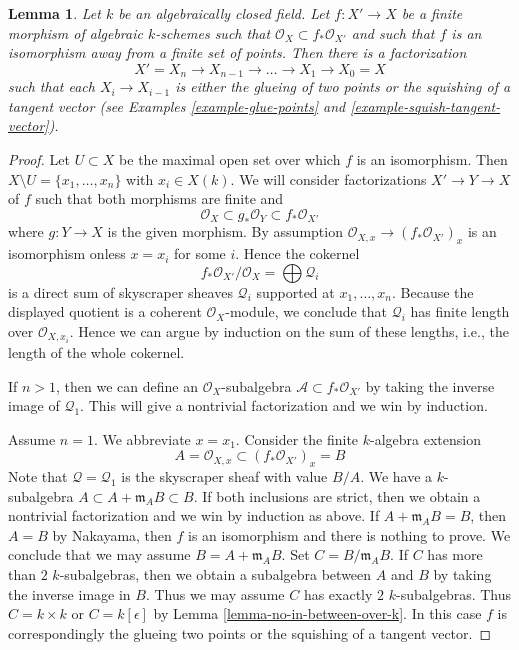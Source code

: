 \documentclass{stacks-project}
\theoremstyle{plain}
\newtheorem{lemma}[subsection]{Lemma}
\theoremstyle{definition}
\theoremstyle{remark}
\numberwithin{equation}{subsection}
\begin{document}
\begin{lemma}
\label{lemma-factor-almost-isomorphism}
Let $k$ be an algebraically closed field. Let $f : X' \to X$ be a
finite morphism of algebraic $k$-schemes such that
$\mathcal{O}_X \subset f_*\mathcal{O}_{X'}$ and such that $f$ is an
isomorphism away from a finite set of points. Then there is a factorization
$$
X' = X_n \to X_{n - 1} \to \ldots \to X_1 \to X_0 = X
$$
such that each $X_i \to X_{i - 1}$ is either the glueing of
two points or the squishing of a tangent vector
(see Examples \ref{example-glue-points} and
\ref{example-squish-tangent-vector}).
\end{lemma}

\begin{proof}
Let $U \subset X$ be the maximal open set over which $f$ is an isomorphism.
Then $X \setminus U = \{x_1, \ldots, x_n\}$ with $x_i \in X(k)$.
We will consider factorizations $X' \to Y \to X$ of $f$ such that
both morphisms are finite and
$$
\mathcal{O}_X \subset g_*\mathcal{O}_Y \subset f_*\mathcal{O}_{X'}
$$
where $g : Y \to X$ is the given morphism. By assumption
$\mathcal{O}_{X, x} \to (f_*\mathcal{O}_{X'})_x$ is an isomorphism
onless $x = x_i$ for some $i$. Hence the cokernel
$$
f_*\mathcal{O}_{X'}/\mathcal{O}_X = \bigoplus \mathcal{Q}_i
$$
is a direct sum of skyscraper sheaves $\mathcal{Q}_i$ supported at
$x_1, \ldots, x_n$.
Because the displayed quotient is a coherent $\mathcal{O}_X$-module,
we conclude that $\mathcal{Q}_i$ has finite length over
$\mathcal{O}_{X, x_i}$. Hence we can argue
by induction on the sum of these lengths, i.e., the length of
the whole cokernel.

\medskip\noindent
If $n > 1$, then we can define an $\mathcal{O}_X$-subalgebra
$\mathcal{A} \subset f_*\mathcal{O}_{X'}$ by taking the inverse
image of $\mathcal{Q}_1$. This will give a nontrivial factorization
and we win by induction.

\medskip\noindent
Assume $n = 1$. We abbreviate $x = x_1$. Consider the finite
$k$-algebra extension
$$
A = \mathcal{O}_{X, x} \subset (f_*\mathcal{O}_{X'})_x = B
$$
Note that $\mathcal{Q} = \mathcal{Q}_1$ is the skyscraper sheaf
with value $B/A$.
We have a $k$-subalgebra $A \subset A + \mathfrak m_A B \subset B$.
If both inclusions are strict, then we obtain a nontrivial
factorization and we win by induction as above.
If $A + \mathfrak m_A B = B$, then $A = B$ by Nakayama, then
$f$ is an isomorphism and there is nothing to prove.
We conclude that we may assume $B = A + \mathfrak m_A B$.
Set $C = B/\mathfrak m_A B$. If $C$ has more than $2$
$k$-subalgebras, then we obtain a subalgebra between $A$
and $B$ by taking the inverse image in $B$. Thus we may
assume $C$ has exactly $2$ $k$-subalgebras. Thus $C = k \times k$
or $C = k[\epsilon]$ by Lemma \ref{lemma-no-in-between-over-k}.
In this case $f$ is correspondingly the glueing two points or the
squishing of a tangent vector.
\end{proof}
\end{document}

